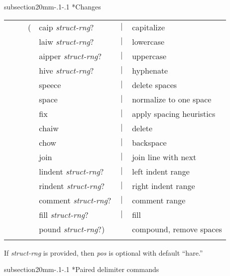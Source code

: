\documentclass[twocolumn,10pt]{article}
\makeatletter
\renewcommand{\subsection}{\@startsection
  {subsection}{2}{0mm}{-.1\baselineskip}{-.1\baselineskip}%
  {\normalfont\bfseries}}
\newcommand{\vbar}{$\,|\,$}
\newcommand{\command}[1]{\textsf{\textup{#1}}}
\newcommand{\cat}[1]{\textrm{\textit{#1}}}
\newenvironment{mycenter}
{\begin{trivlist}\item \begin{footnotesize}}
{\end{footnotesize}\end{trivlist}}
\makeatother
\begin{document}
\subsection*{Changes}

\begin{mycenter} 
  \begin{tabular}{l@{}l@{}lll}
    ~~~&(& \command{caip}  \cat{struct-rng}? & \vbar & capitalize\\
&& \command{laiw}  \cat{struct-rng}? & \vbar & lowercase \\
&& \command{aipper} \cat{struct-rng}? & \vbar & uppercase \\
&& \command{hive}   \cat{struct-rng}? & \vbar & hyphenate\\
&& \command{speece} & \vbar & delete spaces\\
&& \command{space} & \vbar & normalize to one space\\
&& \command{fix} & \vbar & apply spacing heuristics \\
&& \command{chaiw} & \vbar & delete\\
&& \command{chow} & \vbar & backspace\\
&& \command{join} & \vbar & join line with next\\  
&& \command{lindent} \cat{struct-rng}? & \vbar & left indent range\\
&& \command{rindent} \cat{struct-rng}? & \vbar & right indent range\\
&& \command{comment} \cat{struct-rng}? & \vbar & comment range\\
&& \command{fill} \cat{struct-rng}? &  \vbar & fill \\
&& \command{pound}  \cat{struct-rng}?) & & compound, remove spaces\\
&& \makebox[0ex][l]{%
\cat{pos} %
}
  \end{tabular}
\end{mycenter}
\begin{footnotesize}
  If \cat{struct-rng} is provided, then \cat{pos} is optional with
  default ``hare.''
\end{footnotesize}


\subsection*{Paired delimiter commands}
\end{document}
